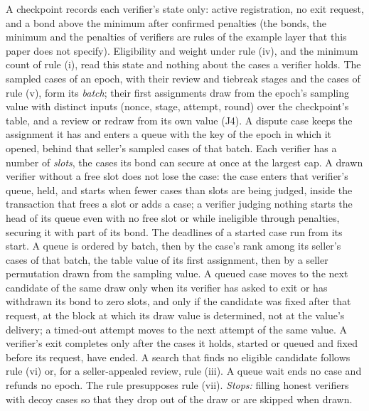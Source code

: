 \documentclass[10pt,a4paper]{article}
\theoremstyle{plain}
\theoremstyle{remark}
\begin{document}
\begin{list}{}
\item[(viii)] A checkpoint records each verifier's state only: active registration, no exit request, and a bond above the minimum after confirmed penalties (the bonds, the minimum and the penalties of verifiers are rules of the example layer that this paper does not specify). Eligibility and weight under rule (iv), and the minimum count of rule (i), read this state and nothing about the cases a verifier holds. The sampled cases of an epoch, with their review and tiebreak stages and the cases of rule (v), form its \emph{batch}; their first assignments draw from the epoch's sampling value with distinct inputs (nonce, stage, attempt, round) over the checkpoint's table, and a review or redraw from its own value (J4). A dispute case keeps the assignment it has and enters a queue with the key of the epoch in which it opened, behind that seller's sampled cases of that batch. Each verifier has a number of \emph{slots}, the cases its bond can secure at once at the largest cap. A drawn verifier without a free slot does not lose the case: the case enters that verifier's queue, held, and starts when fewer cases than slots are being judged, inside the transaction that frees a slot or adds a case; a verifier judging nothing starts the head of its queue even with no free slot or while ineligible through penalties, securing it with part of its bond. The deadlines of a started case run from its start. A queue is ordered by batch, then by the case's rank among its seller's cases of that batch, the table value of its first assignment, then by a seller permutation drawn from the sampling value. A queued case moves to the next candidate of the same draw only when its verifier has asked to exit or has withdrawn its bond to zero slots, and only if the candidate was fixed after that request, at the block at which its draw value is determined, not at the value's delivery; a timed-out attempt moves to the next attempt of the same value. A verifier's exit completes only after the cases it holds, started or queued and fixed before its request, have ended. A search that finds no eligible candidate follows rule (vi) or, for a seller-appealed review, rule (iii). A queue wait ends no case and refunds no epoch. The rule presupposes rule (vii). \emph{Stops:} filling honest verifiers with decoy cases so that they drop out of the draw or are skipped when drawn.
\end{list}
\end{document}
